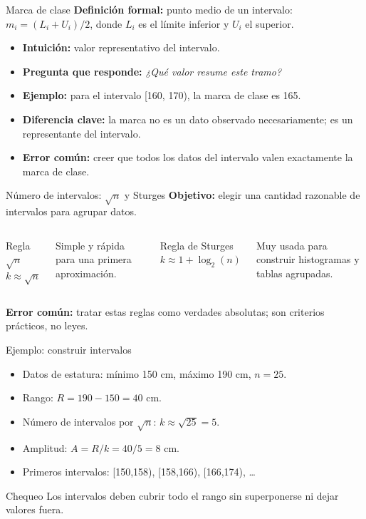 \documentclass[aspectratio=169,11pt]{beamer}
\newcommand{\pregunta}[1]{\textbf{Pregunta que responde:} \emph{#1}}
\newcommand{\errorcomun}[1]{\textbf{Error común:} #1}
\newcommand{\diferencia}[1]{\textbf{Diferencia clave:} #1}
\begin{document}
\begin{frame}{Marca de clase}
\textbf{Definición formal:} punto medio de un intervalo: $m_i=(L_i+U_i)/2$, donde $L_i$ es el límite inferior y $U_i$ el superior.
\begin{itemize}
  \item \textbf{Intuición:} valor representativo del intervalo.
  \item \pregunta{¿Qué valor resume este tramo?}
  \item \textbf{Ejemplo:} para el intervalo [160, 170), la marca de clase es 165.
  \item \diferencia{la marca no es un dato observado necesariamente; es un representante del intervalo.}
  \item \errorcomun{creer que todos los datos del intervalo valen exactamente la marca de clase.}
\end{itemize}
\end{frame}

\begin{frame}{Número de intervalos: $\sqrt{n}$ y Sturges}
\textbf{Objetivo:} elegir una cantidad razonable de intervalos para agrupar datos.
\begin{columns}[T]
\begin{block}{Regla $\sqrt{n}$}
$k \approx \sqrt{n}$
\end{block}
Simple y rápida para una primera aproximación.
\begin{block}{Regla de Sturges}
$k \approx 1+\log_2(n)$
\end{block}
Muy usada para construir histogramas y tablas agrupadas.
\end{columns}
\vspace{0.6em}
\errorcomun{tratar estas reglas como verdades absolutas; son criterios prácticos, no leyes.}
\end{frame}

\begin{frame}{Ejemplo: construir intervalos}
\begin{itemize}
  \item Datos de estatura: mínimo 150 cm, máximo 190 cm, $n=25$.
  \item Rango: $R=190-150=40$ cm.
  \item Número de intervalos por $\sqrt{n}$: $k\approx\sqrt{25}=5$.
  \item Amplitud: $A=R/k=40/5=8$ cm.
  \item Primeros intervalos: [150,158), [158,166), [166,174), \dots
\end{itemize}
\begin{block}{Chequeo}
Los intervalos deben cubrir todo el rango sin superponerse ni dejar valores fuera.
\end{block}
\end{frame}
\end{document}
